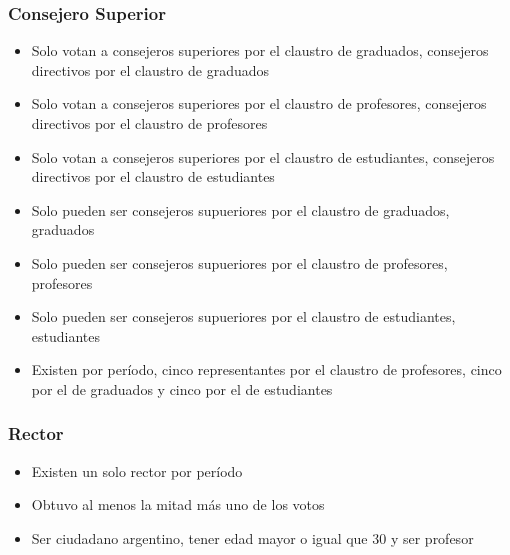 \documentclass[a4paper, 10pt, twoside]{article}
\begin{document}
\subsubsection{Consejero Superior}

\begin{itemize}
\item Solo votan a consejeros superiores por el claustro de graduados, consejeros directivos por el claustro de graduados
\item Solo votan a consejeros superiores por el claustro de profesores, consejeros directivos por el claustro de profesores
\item Solo votan a consejeros superiores por el claustro de estudiantes, consejeros directivos por el claustro de estudiantes
\item Solo pueden ser consejeros supueriores por el claustro de graduados, graduados
\item Solo pueden ser consejeros supueriores por el claustro de profesores, profesores
\item Solo pueden ser consejeros supueriores por el claustro de estudiantes, estudiantes
\item Existen por período, cinco representantes por el claustro de profesores, cinco por el de graduados y cinco por el de estudiantes
\end{itemize}


\subsubsection{Rector}

\begin{itemize}
\item Existen un solo rector por período
\item Obtuvo al menos la mitad más uno de los votos
\item Ser ciudadano argentino, tener edad mayor o igual que 30 y ser profesor
\end{itemize}


\end{document}
